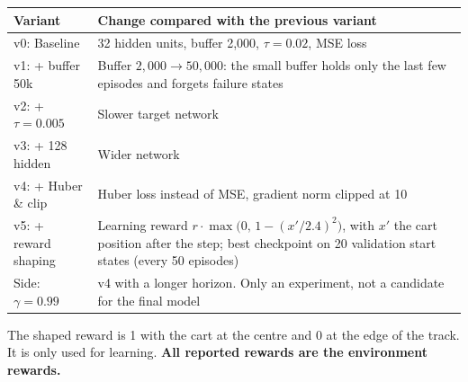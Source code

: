 \begin{center}
\small
\begin{tabularx}{\textwidth}{@{}lL@{}}
  \toprule
  \textbf{Variant} & \textbf{Change compared with the previous variant} \\
  \midrule
  v0: Baseline & 32 hidden units, buffer 2,000, $\tau = 0.02$, MSE loss \\
  v1: + buffer 50k & Buffer $2{,}000 \to 50{,}000$: the small buffer holds only the last few episodes and forgets failure states \\
  v2: + $\tau = 0.005$ & Slower target network \\
  v3: + 128 hidden & Wider network \\
  v4: + Huber \& clip & Huber loss instead of MSE, gradient norm clipped at 10 \\
  v5: + reward shaping & Learning reward $r \cdot \max\!\big(0,\, 1 - (x'/2.4)^2\big)$, with $x'$ the cart position after the step; best checkpoint on 20 validation start states (every 50 episodes) \\
  \midrule
  Side: $\gamma = 0.99$ & v4 with a longer horizon. Only an experiment, not a candidate for the final model \\
  \bottomrule
\end{tabularx}
\end{center}

The shaped reward is 1 with the cart at the centre and 0 at the edge of the track. It is only used for learning. \textbf{All reported rewards are the environment rewards.}


